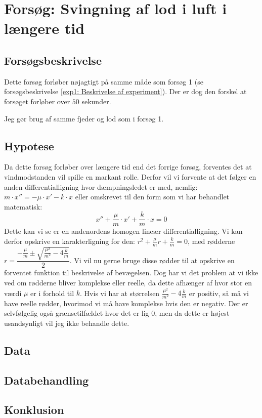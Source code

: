 \section{Forsøg: Svingning af lod i luft i længere tid}

\subsection{Forsøgsbeskrivelse}
Dette forsøg forløber nøjagtigt på samme måde som forsøg 1 (se forsøgsbeskrivelse \ref{exp1: Beskrivelse af experiment}).
Der er dog den forskel at forsøget forløber over $50$ sekunder.

Jeg gør brug af samme fjeder og lod som i forsøg 1.

\subsection{Hypotese}
Da dette forsøg forløber over længere tid end det forrige forsøg, forventes det at vindmodstanden vil spille en markant rolle. 
Derfor vil vi forvente at det følger en anden differentialligning hvor dæmpningsledet er med, nemlig:
$m\cdot x''= -\mu \cdot x' - k\cdot x$
eller omskrevet til den form som vi har behandlet matematisk:
$$x''+ \frac{\mu}{m} \cdot x' + \frac{k}{m}\cdot x=0$$
Dette kan vi  se er en andenordens homogen lineær differentialligning.
Vi kan derfor opskrive en karakterligning for den:
$r^2 + \frac{\mu}{m} r + \frac{k}{m} = 0$, med rødderne $r = \dfrac{-\frac{\mu}{m} \pm \sqrt{\frac{\mu^2}{m^2}-4\frac{k}{m}}}{2}$.
Vi vil nu gerne bruge disse rødder til at opskrive en forventet funktion til beskrivelse af bevægelsen. 
Dog har vi det problem at vi ikke ved om rødderne bliver komplekse eller reelle, da dette afhænger af hvor stor en værdi $\mu$ er i forhold til $k$.
Hvis vi har at størrelsen $\frac{\mu^2}{m^2}-4\frac{k}{m}$ er positiv, så må vi have reelle rødder, hvorimod vi må have komplekse hvis den er negativ. 
Der er selvfølgelig også grænsetilfældet hvor det er lig 0, men da dette er højest usandsynligt vil jeg ikke behandle dette. 

\subsection{Data}

\subsection{Databehandling}

\subsection{Konklusion}


